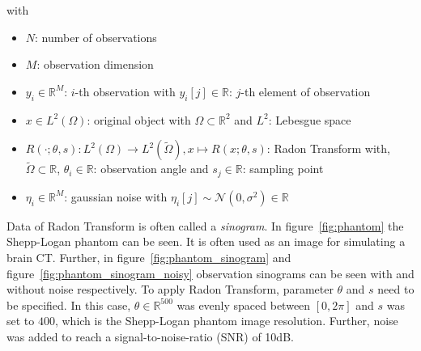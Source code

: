 with
\begin{itemize}
    \item $N$: number of observations
    \item $M$: observation dimension
    \item $y_i \in \mathbb{R}^M$:  $i$-th observation with $y_i[j] \in \mathbb{R}$: $j$-th element of observation
    \item $x \in L^2(\Omega)$: original object with $\Omega \subset \mathbb{R}^2 $ and $L^2$: Lebesgue space
    \item $R(\cdot; \theta, s): L^2(\Omega) \to L^2(\tilde{\Omega}) , x \mapsto R(x; \theta,s)$: Radon Transform \cite{radonTransform} with,\\
        $\tilde{\Omega} \subset \mathbb{R}$, $\theta_i \in \mathbb{R}$: observation angle and $s_j \in \mathbb{R}$: sampling point 
    \item $\eta_i \in \mathbb{R}^M$: gaussian noise with $\eta_i[j] \sim \mathcal{N}(0,\sigma^2) \in \mathbb{R}$
\end{itemize}



Data of Radon Transform is often called a \textit{sinogram}.
In figure~\ref{fig:phantom} the Shepp-Logan phantom can be seen. 
It is often used as an image for simulating a brain CT.
Further, in figure~\ref{fig:phantom_sinogram} and figure~\ref{fig:phantom_sinogram_noisy} 
observation sinograms can be seen with and without noise respectively. 
To apply Radon Transform, parameter $\theta$ and $s$ need to be specified.
In this case, $\theta \in \mathbb{R}^{500}$ was evenly spaced
between $[0, 2 \pi]$ and $s$ was set to $400$, which is the Shepp-Logan phantom image resolution.
Further, noise was added to reach a signal-to-noise-ratio (SNR) of 10dB.

